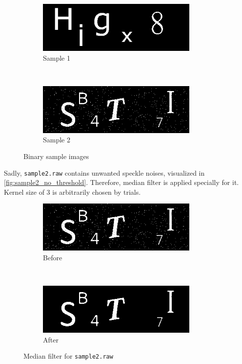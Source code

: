 \documentclass[12pt]{article}
\begin{document}
\begin{figure}[H]
    \centering
    \begin{subfigure}[t]{0.5\textwidth}
        \centering
        \includegraphics[height=1in]{images/sample1_binary}
        \caption{Sample 1}
    \end{subfigure}%
    ~
    \begin{subfigure}[t]{0.5\textwidth}
        \centering
        \includegraphics[height=1in]{images/sample2_binary}
        \caption{Sample 2}
        \label{fig:sample2_no_threshold}
    \end{subfigure}
    \caption{Binary sample images}
\end{figure}

Sadly, {\tt sample2.raw} contains unwanted speckle noises, visualized in \autoref{fig:sample2_no_threshold}. Therefore, median filter is applied specially for it. Kernel size of 3 is arbitrarily chosen by trials.

\begin{figure}[H]
    \centering
    \begin{subfigure}[t]{0.5\textwidth}
        \centering
        \includegraphics[height=1in]{images/sample2_binary}
        \caption{Before}
    \end{subfigure}%
    ~
    \begin{subfigure}[t]{0.5\textwidth}
        \centering
        \includegraphics[height=1in]{images/sample2_binary_filtered}
        \caption{After}
    \end{subfigure}
    \caption{Median filter for {\tt sample2.raw}}
\end{figure}
\end{document}
